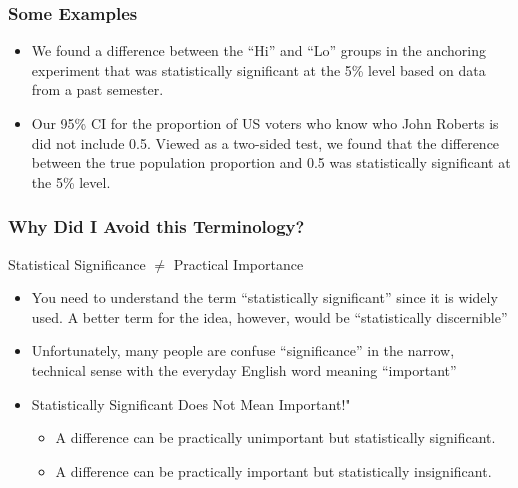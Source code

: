 \documentclass[handout]{beamer}
\begin{document}
\begin{frame}
\frametitle{Some Examples}

	\begin{itemize}
		\item We found a difference between the ``Hi'' and ``Lo'' groups in the anchoring experiment that was statistically significant at the 5\% level based on data from a past semester.
		\item Our 95\% CI for the proportion of US voters who know who John Roberts is did not include 0.5. Viewed as a two-sided test, we found that the difference between the true population proportion and 0.5 was statistically significant at the 5\% level.
	\end{itemize}

\end{frame}
\begin{frame}
\frametitle{Why Did I Avoid this Terminology?}
\small
\begin{block}{Statistical Significance $\neq$ Practical Importance}
	\begin{itemize}
		\item You need to understand the term ``statistically significant'' since it is widely used. A better term for the idea, however, would be ``statistically discernible''
		\item Unfortunately, many people are confuse ``significance'' in the narrow, technical sense with the everyday English word meaning ``important'' 
		\item \alert{Statistically Significant Does Not Mean Important!"}
			\begin{itemize}
				\item A difference can be practically unimportant but statistically significant.
				\item A difference can be practically important but statistically insignificant.
			\end{itemize}
	\end{itemize}
\end{block}


\end{frame}
\end{document}
